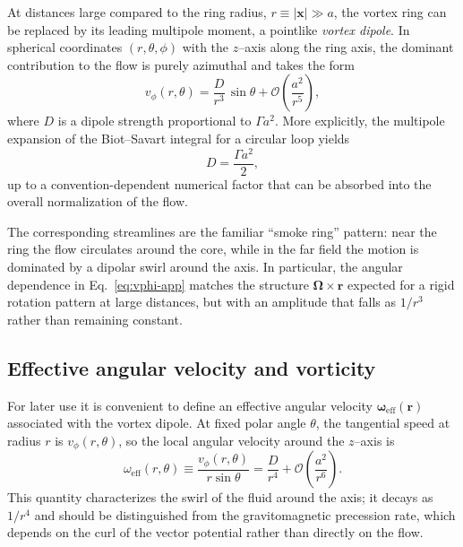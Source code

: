 \documentclass[11pt]{article}
\begin{document}
At distances large compared to the ring radius, $r\equiv|\mathbf{x}|
\gg a$, the vortex ring can be replaced by its leading multipole
moment, a pointlike \emph{vortex dipole}.
In spherical coordinates $(r,\theta,\phi)$ with the $z$–axis along
the ring axis, the dominant contribution to the flow is purely
azimuthal and takes the form
\begin{equation}
  v_\phi(r,\theta)
  = \frac{D}{r^3}\,\sin\theta
  + \mathcal{O}\!\left(\frac{a^2}{r^5}\right),
  \label{eq:vphi-app}
\end{equation}
where $D$ is a dipole strength proportional to $\Gamma a^2$.
More explicitly, the multipole expansion of the Biot--Savart integral
for a circular loop yields
\begin{equation}
  D = \frac{\Gamma a^2}{2},
  \label{eq:D-Gamma-a}
\end{equation}
up to a convention-dependent numerical factor that can be absorbed
into the overall normalization of the flow.

The corresponding streamlines are the familiar ``smoke ring''
pattern: near the ring the flow circulates around the core, while in
the far field the motion is dominated by a dipolar swirl around the
axis.
In particular, the angular dependence in Eq.~\eqref{eq:vphi-app}
matches the structure $\bm{\Omega}\times\mathbf{r}$ expected for a
rigid rotation pattern at large distances, but with an amplitude that
falls as $1/r^3$ rather than remaining constant.

\subsection{Effective angular velocity and vorticity}

For later use it is convenient to define an effective angular
velocity $\bm{\omega}_{\text{eff}}(\mathbf{r})$ associated with the
vortex dipole.
At fixed polar angle $\theta$, the tangential speed at radius $r$ is
$v_\phi(r,\theta)$, so the local angular velocity around the $z$–axis
is
\begin{equation}
  \omega_{\text{eff}}(r,\theta)
  \equiv \frac{v_\phi(r,\theta)}{r\sin\theta}
  = \frac{D}{r^4}
  + \mathcal{O}\!\left(\frac{a^2}{r^6}\right).
\end{equation}
This quantity characterizes the swirl of the fluid around the axis;
it decays as $1/r^4$ and should be distinguished from the
gravitomagnetic precession rate, which depends on the curl of the
vector potential rather than directly on the flow.
\end{document}
